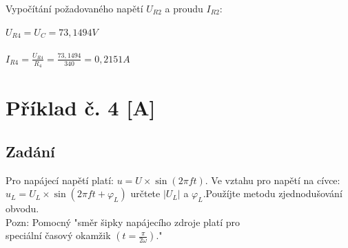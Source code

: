 \documentclass[12pt,a4paper,titlepage,final]{article}
\begin{document}
	Vypočítání požadovaného napětí $U_{R2}$ a proudu $I_{R2}$:
	
	\begin{tabbing}
		$U_{R4} = U_{C} = 73,1494 V$ \\
		\\
		${ \displaystyle I_{R4} = 
		\frac{U_{R4}}{R_{4}} =
		\frac{73,1494}{340} = 0,2151 A }$
	\end{tabbing}


	\newpage


	\section*{Příklad č. 4 [A]} \label{pr4}


	\subsection*{Zadání}

	Pro napájecí napětí platí: $u = U \times \sin(2\pi ft)$.
	Ve vztahu pro napětí na cívce: \\ 
	$u_{L} = U_{L} \times \sin(2\pi ft + \varphi_{L})$ určtete $|U_{L}|$
	a $\varphi_{L}$.Použíjte metodu zjednodušování \\
	obvodu. \\
	
	\noindent Pozn: Pomocný "směr šipky napájecího zdroje platí pro \\
	speciální časový okamžik $(t = \frac{\pi}{2\omega} )$." \\
	\\
	
\end{document}
